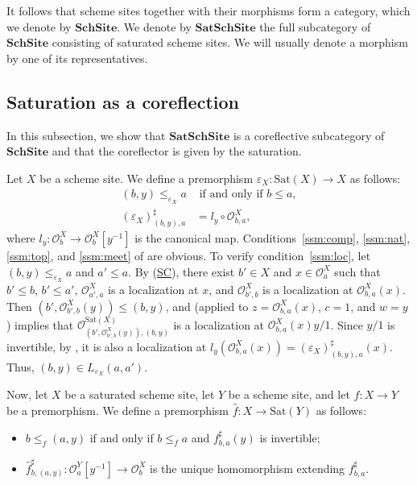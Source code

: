 \documentclass[reqno]{amsart}
\newcommand{\axref}[1]{(\hyperref[ax:#1]{#1})}
\theoremstyle{definition}
\theoremstyle{remark}
\numberwithin{figure}{section}
\newcommand{\cat}[1]{\mathbf{#1}}
\begin{document}
It follows that scheme sites together with their morphisms form a category, which we denote by $\cat{SchSite}$.
We denote by $\cat{SatSchSite}$ the full subcategory of $\cat{SchSite}$ consisting of saturated scheme sites.
We will usually denote a morphism by one of its representatives.

\subsection{Saturation as a coreflection}

In this subsection, we show that $\cat{SatSchSite}$ is a coreflective subcategory of $\cat{SchSite}$ and that the coreflector is given by the saturation.

Let $X$ be a scheme site.
We define a premorphism $\varepsilon_X : \mathrm{Sat}(X) \to X$ as follows:
\begin{align*}
(b,y) \leq_{\varepsilon_X} a & \text{ if and only if } b \leq a, \\
(\varepsilon_X)^\sharp_{(b,y),a} & = l_y \circ \mathcal{O}^X_{b,a},
\end{align*}
where $l_y : \mathcal{O}^X_b \to \mathcal{O}^X_b[y^{-1}]$ is the canonical map.
Conditions~\eqref{ssm:comp}, \eqref{ssm:nat}, \eqref{ssm:top}, and \eqref{ssm:meet} of  are obvious.
To verify condition~\eqref{ssm:loc}, let $(b,y) \leq_{\varepsilon_X} a$ and $a' \leq a$.
By \axref{SC}, there exist $b' \in X$ and $x \in \mathcal{O}^X_a$ such that $b' \leq b$, $b' \leq a'$, $\mathcal{O}^X_{a',a}$ is a localization at $x$, and $\mathcal{O}^X_{b',b}$ is a localization at $\mathcal{O}^X_{b,a}(x)$.
Then $(b', \mathcal{O}^X_{b',b}(y)) \leq (b,y)$, and  (applied to $z = \mathcal{O}^X_{b,a}(x)$, $c = 1$, and $w = y$) implies that
$\mathcal{O}^{\mathrm{Sat}(X)}_{(b',\mathcal{O}^X_{b',b}(y)),(b,y)}$ is a localization at $\mathcal{O}^X_{b,a}(x) y / 1$.
Since $y/1$ is invertible, by , it is also a localization at $l_y(\mathcal{O}^X_{b,a}(x)) = (\varepsilon_X)^\sharp_{(b,y),a}(x)$.
Thus, $(b,y) \in L_{\varepsilon_X}(a,a')$.

Now, let $X$ be a saturated scheme site, let $Y$ be a scheme site, and let $f : X \to Y$ be a premorphism.
We define a premorphism $\widehat{f} : X \to \mathrm{Sat}(Y)$ as follows:
\begin{itemize}
\item $b \leq_{\widehat{f}} (a,y)$ if and only if $b \leq_f a$ and $f^\sharp_{b,a}(y)$ is invertible;
\item $\widehat{f}^\sharp_{b,(a,y)} : \mathcal{O}^Y_a[y^{-1}] \to \mathcal{O}^X_b$ is the unique homomorphism extending $f^\sharp_{b,a}$.
\end{itemize}
\end{document}
